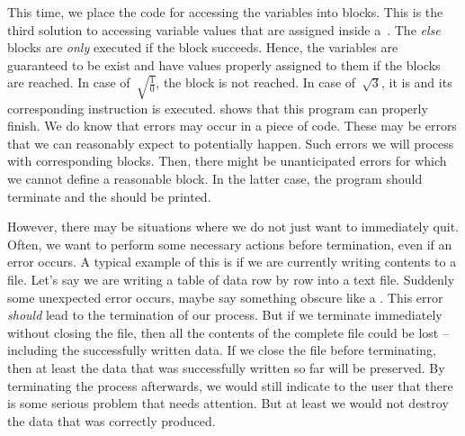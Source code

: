 This time, we place the code for accessing the variables into  blocks.
This is the third solution to accessing variable values that are assigned inside a~.
The \emph{else} blocks are \emph{only} executed if the  block succeeds.
Hence, the variables are guaranteed to be exist and have values properly assigned to them if the  blocks are reached.
In case of~$\sqrt{\frac{1}{0}}$, the  block is not reached.
In case of~$\sqrt{3}$, it is and its corresponding  instruction is executed.
 shows that this program can properly finish.%
%
\FloatBarrier%
\endhsection%
%
%
\label{sec:tryFinally}%
%
We do know that errors may occur in a piece of code.
These may be errors that we can reasonably expect to potentially happen.
Such errors we will process with corresponding  blocks.
Then, there might be unanticipated errors for which we cannot define a reasonable  block.
In the latter case, the program should terminate and the  should be printed.

However, there may be situations where we do not just want to immediately quit.
Often, we want to perform some necessary actions before termination, even if an  error occurs.
A typical example of this is if we are currently writing contents to a file.
Let's say we are writing a table of data row by row into a text file.
Suddenly some unexpected error occurs, maybe say something obscure like a .
This error \emph{should} lead to the termination of our process.
But if we terminate immediately without closing the file, then all the contents of the complete file could be lost -- including the successfully written data.
If we close the file before terminating, then at least the data that was successfully written so far will be preserved.
By terminating the process afterwards, we would still indicate to the user that there is some serious problem that needs attention.
But at least we would not destroy the data that was correctly produced.


